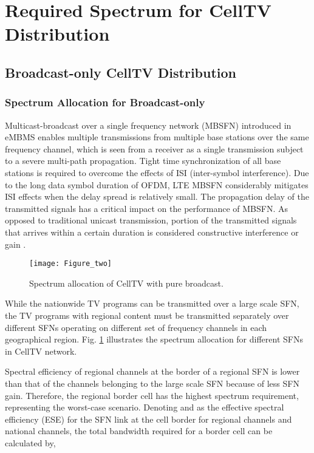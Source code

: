\documentclass[journal]{IEEEtran}
\begin{document}
\section{Required Spectrum for CellTV Distribution }\label{sec:spectrum}
\subsection{Broadcast-only CellTV Distribution}
\subsubsection{\textbf{Spectrum Allocation for Broadcast-only}}\label{sec:BW_broad}


Multicast-broadcast over a single frequency network (MBSFN) introduced in eMBMS enables multiple transmissions from multiple base stations over the same frequency channel, which is seen from a receiver as a single transmission subject to a severe multi-path propagation. Tight time synchronization of all base stations is required to overcome the effects of ISI (inter-symbol interference). Due to the long data symbol duration of OFDM, LTE MBSFN considerably mitigates ISI effects when the delay spread is relatively small. The propagation delay of the transmitted signals has a critical impact on the performance of MBSFN. As opposed to traditional unicast transmission, portion of the transmitted signals that arrives within a certain duration is considered constructive interference or gain \cite{Rong08}.

\begin{figure}[t]
  \centering
  \texttt{[image: Figure\_two]}\\
  \caption{Spectrum allocation of CellTV with pure broadcast.}\label{fig:broadcast_diag}
\end{figure}

While the nationwide TV programs can be transmitted over a large scale SFN, the TV programs with regional content must be transmitted separately over different SFNs operating on different set of frequency channels in each geographical region. Fig. \ref{fig:broadcast_diag} illustrates the spectrum allocation for different SFNs in CellTV network.


Spectral efficiency of regional channels at the border of a regional SFN is lower than that of the channels belonging to the large scale SFN because of less SFN gain. Therefore, the regional border cell has the highest spectrum requirement, representing the worst-case scenario. Denoting  and  as the effective spectral efficiency (ESE) for the SFN link at the cell border for regional channels and national channels, the total bandwidth required for a border cell can be calculated by,	
\end{document}
